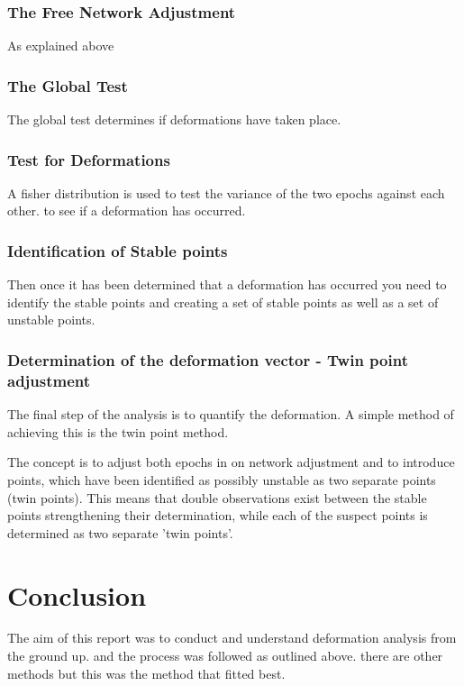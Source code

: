 \documentclass[12pt,a4paper]{article}
\begin{document}
			\subsubsection{The Free Network Adjustment}
			
				As explained above
				
			\subsubsection{The Global Test}
			
				The global test determines if deformations have taken place.
				
			\subsubsection{Test for Deformations}
				A fisher distribution is used to test the variance of the two epochs against each other. to see if a deformation has occurred.
				
			\subsubsection{Identification of Stable points}	
				
				Then once it has been determined that a deformation has occurred you need to identify the stable points and creating a set of stable points as well as a set of unstable points.
				
			\subsubsection{Determination of the deformation vector - Twin point adjustment}
				The final step of the analysis is to quantify the deformation. A simple method of achieving this is the twin point method.
				
				The concept is to adjust both epochs in on network adjustment and to introduce points, which have been identified as possibly unstable as two separate points (twin points). This means that double observations exist between the stable points strengthening their determination, while each of the suspect points is determined as two separate 'twin points'.
			
	
	\section{Conclusion}
		The aim of this report was to conduct and understand deformation analysis from the ground up. and the process was followed as outlined above. there are other methods but this was the method that fitted best.
	
	
	
\end{document}
